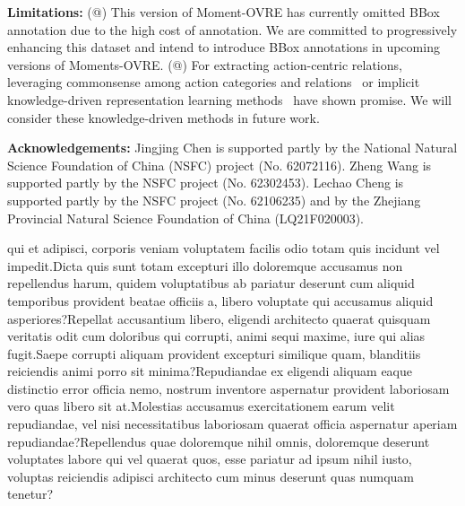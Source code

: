 \documentclass[letterpaper]{article}
\makeatletter
\newcommand{\Rmnum}[1]{\expandafter\@slowromancap\romannumeral #1@}
\makeatother
\begin{document}
\noindent \textbf{Limitations:}
(\Rmnum{1}) This version of Moment-OVRE has currently omitted BBox annotation due to the high cost of annotation. We are committed to progressively enhancing this dataset and intend to introduce BBox annotations in upcoming versions of Moments-OVRE.
(\Rmnum{2}) For extracting action-centric relations, leveraging commonsense among action categories and relations~\cite{yang2018commonsense} or implicit knowledge-driven representation learning methods~\cite{li2023knowledge, li2018deep} have shown promise. We will consider these knowledge-driven methods in future work.

\hspace*{\fill}

\vspace{-1.82mm}
\vspace{-1.57mm}
\noindent \textbf{Acknowledgements:} Jingjing Chen is supported partly by the National Natural Science Foundation of China (NSFC) project (No. 62072116). Zheng Wang is supported partly by the NSFC project (No. 62302453). Lechao Cheng is supported partly by the NSFC project (No. 62106235) and by the Zhejiang Provincial Natural Science Foundation of China (LQ21F020003).


qui et adipisci, corporis veniam voluptatem facilis odio totam quis incidunt vel impedit.Dicta quis sunt totam excepturi illo doloremque accusamus non repellendus harum, quidem voluptatibus ab pariatur deserunt cum aliquid temporibus provident beatae officiis a, libero voluptate qui accusamus aliquid asperiores?Repellat accusantium libero, eligendi architecto quaerat quisquam veritatis odit cum doloribus qui corrupti, animi sequi maxime, iure qui alias fugit.Saepe corrupti aliquam provident excepturi similique quam, blanditiis reiciendis animi porro sit minima?Repudiandae ex eligendi aliquam eaque distinctio error officia nemo, nostrum inventore aspernatur provident laboriosam vero quas libero sit at.Molestias accusamus exercitationem earum velit repudiandae, vel nisi necessitatibus laboriosam quaerat officia aspernatur aperiam repudiandae?Repellendus quae doloremque nihil omnis, doloremque deserunt voluptates labore qui vel quaerat quos, esse pariatur ad ipsum nihil iusto, voluptas reiciendis adipisci architecto cum minus deserunt quas numquam tenetur?\clearpage

\end{document}
